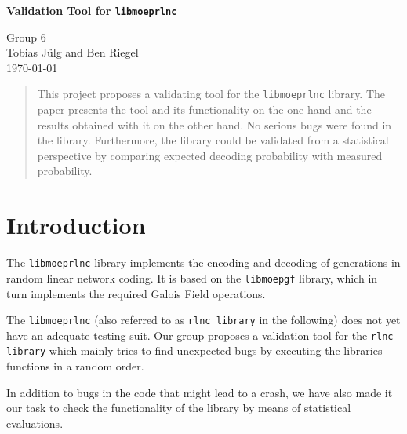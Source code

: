 \documentclass[a4paper,english,10pt]{tumarticle}
\begin{document}
\begin{center}
	\bfseries\Large Validation Tool for \texttt{libmoeprlnc}\\[.5\baselineskip]
\end{center}
\begin{center}
	\large Group 6\\\vspace{0.5cm}
	\small Tobias Jülg and Ben Riegel\\%
	\today
\end{center}


\setcounter{tocdepth}{1}
\renewcommand{\contentsname}{Anlagen}

\renewcommand{\emph}[1]{%
	\textcolor{TUMBlue}{#1}%
}


\renewcommand{\abstractname}{Abstract}
\begin{abstract}
\setlength{\parindent}{0pt}
\noindent%
\footnotesize

This project proposes a validating tool for the \texttt{libmoeprlnc} library. 
The paper presents the tool and its functionality on the one hand and the results 
obtained with it on the other hand. No serious bugs were found in the library. Furthermore, 
the library could be validated from a statistical perspective by comparing expected decoding 
probability with measured probability.

\end{abstract}

\section{Introduction}

The \texttt{libmoeprlnc} library implements the encoding and decoding of generations in
random linear network coding. It is based on the \texttt{libmoepgf} library, which in turn
implements the required Galois Field operations.

The \texttt{libmoeprlnc} (also referred to as \texttt{rlnc library} in the following) does not yet
have an adequate testing suit. Our group proposes a validation tool for the \texttt{rlnc library}
which mainly tries to find unexpected bugs by executing the libraries functions in a random order.

In addition to bugs in the code that might lead to a crash, we have also made it our task to check
the functionality of the library by means of statistical evaluations.
\end{document}

